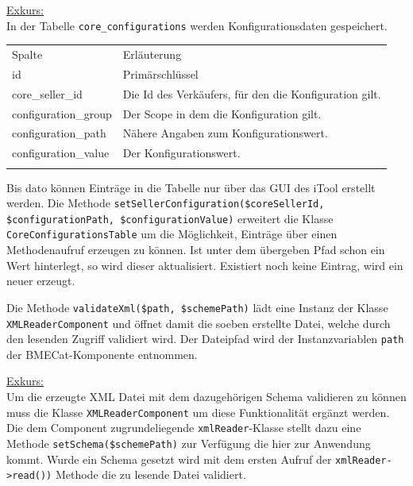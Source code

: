 	\begin{addmargin}[1cm]{1cm}
	\underline{Exkurs:}\\
	 In der Tabelle \texttt{core\_configurations} werden Konfigurationsdaten gespeichert. 	 
	 \begin{table}[!htbp]
	 \begin{addmargin}[1cm]{1cm}
	 \centering
		 		\begin{tabularx}{\linewidth}{p{4cm} X}
		 		\rowcolor[HTML]{EFEFEF} 
		 		Spalte & Erläuterung \\ \cline{1-2} \addlinespace[7pt]
		 		id & Primärschlüssel \\
		 		core\_seller\_id & Die Id des Verkäufers, für den die Konfiguration gilt. \\
		 		configuration\_group & Der Scope in dem die Konfiguration gilt. \\
		 		configuration\_path & Nähere Angaben zum Konfigurationswert. \\
		 		configuration\_value & Der Konfigurationswert. \\\addlinespace[7pt] \cline{1-2} 
		 		\end{tabularx}%
		 	\end{addmargin}
		 	\end{table}
	 
	 Bis dato können Einträge in die Tabelle nur über das GUI des iTool erstellt werden. Die Methode \texttt{setSellerConfiguration(\$coreSellerId, \$configurationPath, \$configurationValue)} erweitert die Klasse \texttt{CoreConfigurationsTable} um die Möglichkeit, Einträge über einen Methodenaufruf erzeugen zu können. Ist unter dem übergeben Pfad schon ein Wert hinterlegt, so wird dieser aktualisiert. Existiert noch keine Eintrag, wird ein neuer erzeugt.
		\end{addmargin}
	
	Die Methode \texttt{validateXml(\$path, \$schemePath)} lädt eine Instanz der Klasse \texttt{XMLReaderComponent} und öffnet damit die soeben erstellte Datei, welche durch den lesenden Zugriff validiert wird. Der Dateipfad wird der Instanzvariablen \texttt{path} der BMECat-Komponente entnommen.
	
		\begin{addmargin}[1cm]{1cm}
		\underline{Exkurs:}\\
		Um die erzeugte XML Datei mit dem dazugehörigen Schema validieren zu können muss die Klasse \texttt{XMLReaderComponent} um diese Funktionalität ergänzt werden. Die dem Component zugrundeliegende \texttt{xmlReader}-Klasse stellt dazu eine Methode \texttt{setSchema(\$schemePath)} zur Verfügung die hier zur Anwendung kommt. Wurde ein Schema gesetzt wird mit dem ersten Aufruf der \texttt{xmlReader->read())} Methode die zu lesende Datei validiert. 
		\end{addmargin}
		
